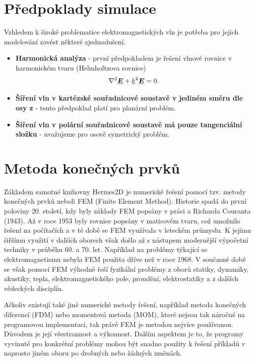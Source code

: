 \section{Předpoklady simulace}
Vzhledem k široké problematice elektromagnetických vln je potřeba pro jejich modelování zavést některé zjednodušení. 
\begin{itemize}
\item {\bf Harmonická analýza} - první předpokladem je řešení vlnové rovnice v harmonickém tvaru (Helmholtzova rovnice)
\begin{displaymath}
	\nabla^{2}\mbox{\underline{\boldmath$E$}} +{\underline{k}}^{2}\mbox{\underline{\boldmath$E$}} = 0.
\end{displaymath}
\item {\bf Šíření vln v kartézské souřadnicové soustavě v jediném směru dle osy z} - tento předpoklad platí pro planární problém.
\item {\bf Šíření vln v polární souřadnicové soustavě má pouze tangenciální složku} - uvažujeme pro osově symetrický problém.
\end{itemize}

\section{Metoda konečných prvků}
Základem samotné knihovny Hermes2D je numerické řešení pomocí tzv. metody konečných prvků neboli FEM (Finite Element Method). Historie spadá do první poloviny 20. století, kdy byly základy FEM popsány v práci a Richarda Couranta (1943). Až v roce 1953 byly rovnice popsány v maticovém tvaru, což umožnilo řešení na počítačích a v té době se FEM využívala v leteckém průmyslu. K jejímu šiřšímu využití v dalších oborech však došlo až s nástupem modernější výpočetní techniky v průběhu 60. a 70. let. Například na problémy týkající se elektromagnetismu nebyla FEM použita dříve než v roce 1968. V současné době se však pomocí FEM výhodně řeší fyzikální problémy z oborů statiky, dynamiky, akustiky, tepla, elektromagnetického pole, proudění, elektrostatiky a z dalších vědeckých disciplín. 

Ačkoliv existují také jiné numerické metody řešení, například metoda konečných diferencí (FDM) nebo momentová metoda (MOM), které nejsou tak náročné na programovou implementaci, tak právě FEM je metodou nejvíce používanou. Důvodem je její všestrannost a výkonnost. Dalším aspektem je to, že programy vyvinuté pro konkrétní problémy mohou být snadno použity k řešení příkladů v naprosto jiném oboru po drobných nebo žádných změnách.

